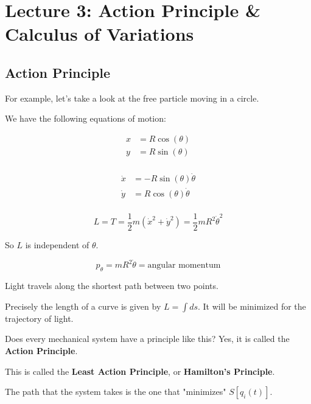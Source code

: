 \section{Lecture 3: Action Principle \& Calculus of Variations}

\subsection{Action Principle}

For example, let's take a look at the free particle moving in a circle.

We have the following equations of motion:

\begin{align*}
    x&=R\cos(\theta)\\
    y&=R\sin(\theta)\\
\end{align*}

\begin{align*}
    \dot{x}&=-R\sin(\theta)\dot{\theta}\\
    \dot{y}&=R\cos(\theta)\dot{\theta}\\
\end{align*}

\[
    L = T = \frac{1}{2} m (\dot{x}^2+\dot{y}^2) = \frac{1}{2} m R^2 \dot{\theta}^2
\]

So $L$ is independent of $\theta$.

\[
    p_\theta =  m R^2 \dot{\theta} = \text{angular momentum}
\]

\begin{definition}
    Light travels along the shortest path between two points.
\end{definition}

Precisely the length of a curve is given by $L=\int ds$. It will be minimized for the trajectory of light.

Does every mechanical system have a principle like this? Yes, it is called the \textbf{Action Principle}.

This is called the \textbf{Least Action Principle}, or \textbf{Hamilton's Principle}.

The path that the system takes is the one that "minimizes" $S[q_i(t)]$.